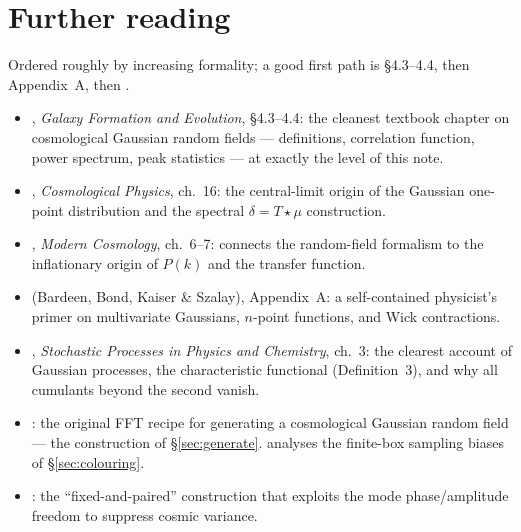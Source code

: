 \documentclass[12pt]{article}
\begin{document}
\section*{Further reading}

Ordered roughly by increasing formality; a good first path is
\citet{MoBoschWhite2010} \S4.3--4.4, then \citet{BBKS1986} Appendix~A,
then \citet{Pen1997}.

\begin{itemize}
  \item \citet{MoBoschWhite2010}, \emph{Galaxy Formation and Evolution},
        \S4.3--4.4: the cleanest textbook chapter on cosmological
        Gaussian random fields --- definitions, correlation function,
        power spectrum, peak statistics --- at exactly the level of this
        note.
  \item \citet{Peacock1999}, \emph{Cosmological Physics}, ch.~16: the
        central-limit origin of the Gaussian one-point distribution and
        the spectral $\delta = T\star\mu$ construction.
  \item \citet{DodelsonSchmidt2020}, \emph{Modern Cosmology}, ch.~6--7:
        connects the random-field formalism to the inflationary origin of
        $P(k)$ and the transfer function.
  \item \citet{BBKS1986} (Bardeen, Bond, Kaiser \& Szalay), Appendix~A:
        a self-contained physicist's primer on multivariate Gaussians,
        $n$-point functions, and Wick contractions.
  \item \citet{vanKampen2007}, \emph{Stochastic Processes in Physics and
        Chemistry}, ch.~3: the clearest account of Gaussian processes,
        the characteristic functional (Definition~3), and why all
        cumulants beyond the second vanish.
  \item \citet{Pen1997}: the original FFT recipe for generating a
        cosmological Gaussian random field --- the construction of
        \S\ref{sec:generate}.  \citet{Sirko2005} analyses the finite-box
        sampling biases of \S\ref{sec:colouring}.
  \item \citet{AnguloPontzen2016}: the ``fixed-and-paired'' construction
        that exploits the mode phase/amplitude freedom to suppress cosmic
        variance.
\end{itemize}
\end{document}
